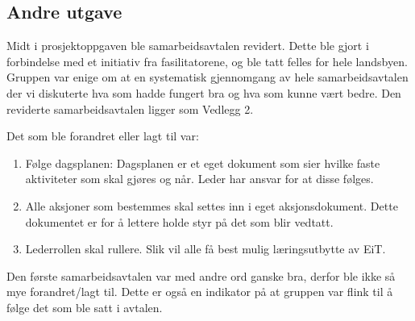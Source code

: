 \subsection{Andre utgave}
Midt i prosjektoppgaven ble samarbeidsavtalen revidert. 
Dette ble gjort i forbindelse med et initiativ fra fasilitatorene, og ble tatt felles for hele landsbyen. 
Gruppen var enige om at en systematisk gjennomgang av hele samarbeidsavtalen der vi diskuterte hva som hadde fungert bra og hva som kunne vært bedre. 
Den reviderte samarbeidsavtalen ligger som Vedlegg 2. 
\vspace{\secspace}

\noindent Det som ble forandret eller lagt til var: 
\begin{enumerate}
  \item Følge dagsplanen: Dagsplanen er et eget dokument som sier hvilke faste aktiviteter som skal gjøres og når. Leder har ansvar for at disse følges. 
  \item Alle aksjoner som bestemmes skal settes inn i eget aksjonsdokument. Dette dokumentet er for å lettere holde styr på det som blir vedtatt.
  \item Lederrollen skal rullere. Slik vil alle få best mulig læringsutbytte av EiT. 
\end{enumerate}

Den første samarbeidsavtalen var med andre ord ganske bra, derfor ble ikke så mye forandret/lagt til. 
Dette er også en indikator på at gruppen var flink til å følge det som ble satt i avtalen. 

